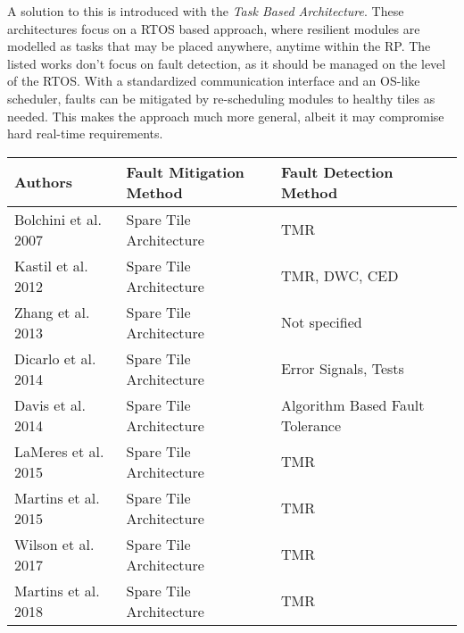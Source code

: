 A solution to this is introduced with the \textit{Task Based Architecture}.
These architectures focus on a \gls{RTOS} based approach, where resilient modules are modelled as tasks that may be placed anywhere, anytime within the \gls{RP}. 
The listed works don't focus on fault detection, as it should be managed on the level of the \gls{RTOS}.
With a standardized communication interface and an OS-like scheduler, faults can be mitigated by re-scheduling modules to healthy tiles as needed. 
This makes the approach much more general, albeit it may compromise hard real-time requirements.
\begin{strip}
    \centering
    \label{tbl:literatureOverview}
    \centering \begin{tabularx}{\textwidth}{lll >{\arraybackslash}X}
        \toprule
       \textbf{Authors} & \textbf{Fault Mitigation Method} & \textbf{Fault Detection Method} \\
       \midrule
       \cite{bolchini2007} Bolchini et al. 2007             & Spare Tile Architecture      & TMR  \\
       \cite{kastil2012} Kastil et al. 2012                 & Spare Tile Architecture      & TMR, DWC, CED  \\
       \cite{zhang2013} Zhang et al. 2013                   & Spare Tile Architecture      & Not specified \\
       \cite{dicarlo2014} Dicarlo et al. 2014               & Spare Tile Architecture      & Error Signals, Tests \\
       \cite{davis2014} Davis et al. 2014                   & Spare Tile Architecture      & Algorithm Based Fault Tolerance \\
       \cite{lameres_radsat_2015} LaMeres et al. 2015       & Spare Tile Architecture      & TMR  \\
       \cite{martins_tmr_2015} Martins et al. 2015          & Spare Tile Architecture      & TMR  \\
       \cite{wilson_hybrid_2017} Wilson et al. 2017         & Spare Tile Architecture      & TMR  \\
       \cite{martins_dynamic_2018} Martins et al. 2018      & Spare Tile Architecture      & TMR  \\

\end{tabularx}
\end{strip}

